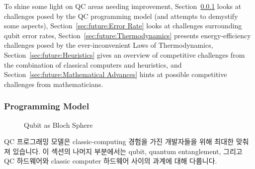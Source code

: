 To shine some light on QC areas needing improvement,
Section~\ref{sec:future:Programming Model} looks at challenges posed by the QC
programming model (and attempts to demystify some aspects),
Section~\ref{sec:future:Error Rate} looks at challenges surrounding qubit
error rates,
Section~\ref{sec:future:Thermodynamics} presents energy-efficiency challenges
posed by the ever-inconvenient Laws of Thermodynamics,
Section~\ref{sec:future:Heuristics} gives an overview of competitive
challenges from the combination of classical computers and heuristics,
and
Section~\ref{sec:future:Mathematical Advances} hints at possible competitive
challenges from mathematicians.
\fi

\subsubsection{Programming Model}
\label{sec:future:Programming Model}

\begin{figure}[tb]
\centering
{}
\caption{Qubit as Bloch Sphere}
\label{fig:future:Qubit as Bloch Sphere}
\end{figure}

QC 프로그래밍 모델은 classic-computing 경험을 가진 개발자들을 위해 최대한
맞춰져 있습니다.
이 섹션의 나머지 부분에서는 qubit, quantum entanglement, 그리고 QC 하드웨어와
classic computer 하드웨어 사이의 과계에 대해 다룹니다.

